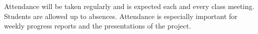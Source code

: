 Attendance will be taken regularly and is expected each and every class meeting. Students are allowed up to \absences{} absences. Attendance is especially important for weekly progress reports and the presentations of the project.
